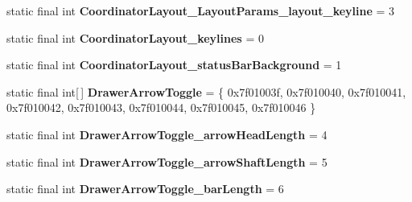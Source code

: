 \begin{DoxyCompactItemize}
\item 
\hypertarget{classandroid_1_1support_1_1design_1_1_r_1_1styleable_ae3e01f81a0c0306a47f6d5f6cc370f25}{}static final int {\bfseries Coordinator\+Layout\+\_\+\+Layout\+Params\+\_\+layout\+\_\+keyline} = 3\label{classandroid_1_1support_1_1design_1_1_r_1_1styleable_ae3e01f81a0c0306a47f6d5f6cc370f25}

\item 
\hypertarget{classandroid_1_1support_1_1design_1_1_r_1_1styleable_ac5dda80c68ac3d8d0bcb7678440d480b}{}static final int {\bfseries Coordinator\+Layout\+\_\+keylines} = 0\label{classandroid_1_1support_1_1design_1_1_r_1_1styleable_ac5dda80c68ac3d8d0bcb7678440d480b}

\item 
\hypertarget{classandroid_1_1support_1_1design_1_1_r_1_1styleable_ae040b68b75d343e4cf3c87d18acb3605}{}static final int {\bfseries Coordinator\+Layout\+\_\+status\+Bar\+Background} = 1\label{classandroid_1_1support_1_1design_1_1_r_1_1styleable_ae040b68b75d343e4cf3c87d18acb3605}

\item 
\hypertarget{classandroid_1_1support_1_1design_1_1_r_1_1styleable_a559d22c78738e5161420dc4b41689c1b}{}static final int\mbox{[}$\,$\mbox{]} {\bfseries Drawer\+Arrow\+Toggle} = \{ 0x7f01003f, 0x7f010040, 0x7f010041, 0x7f010042, 0x7f010043, 0x7f010044, 0x7f010045, 0x7f010046 \}\label{classandroid_1_1support_1_1design_1_1_r_1_1styleable_a559d22c78738e5161420dc4b41689c1b}

\item 
\hypertarget{classandroid_1_1support_1_1design_1_1_r_1_1styleable_a24ad965a1251127297d0ff2c9e45ee06}{}static final int {\bfseries Drawer\+Arrow\+Toggle\+\_\+arrow\+Head\+Length} = 4\label{classandroid_1_1support_1_1design_1_1_r_1_1styleable_a24ad965a1251127297d0ff2c9e45ee06}

\item 
\hypertarget{classandroid_1_1support_1_1design_1_1_r_1_1styleable_a4e429a1922b15c56d792545c996d45d1}{}static final int {\bfseries Drawer\+Arrow\+Toggle\+\_\+arrow\+Shaft\+Length} = 5\label{classandroid_1_1support_1_1design_1_1_r_1_1styleable_a4e429a1922b15c56d792545c996d45d1}

\item 
\hypertarget{classandroid_1_1support_1_1design_1_1_r_1_1styleable_a54b35adfa7a299b34c33e6937cf76daf}{}static final int {\bfseries Drawer\+Arrow\+Toggle\+\_\+bar\+Length} = 6\label{classandroid_1_1support_1_1design_1_1_r_1_1styleable_a54b35adfa7a299b34c33e6937cf76daf}


\end{DoxyCompactItemize}
